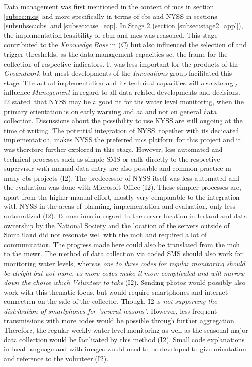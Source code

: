Data management was first mentioned in the context of \acrlong{mcs} in section \ref*{subsec:mcs} and more specifically in terms of \acrlong{cbs} and NYSS in sections \ref*{subsubsec:cbs} and \ref*{subsec:case_eap}. In Stage 2 (section \ref*{subsec:stage2_appl}), the implementation feasibility of \acrshort{cbm} and \acrshort{mcs} was reasoned.\newline
This stage contributed to the \textit{Knowledge Base} in (C) but also influenced the selection of  and trigger thresholds, as the data management capacities set the frame for the collection of respective indicators. It was less important for the products of the \textit{Groundwork} but most developments of the \textit{Innovations} group facilitated this stage. The actual implementation and its technical capacities will also strongly influence \textit{Management} in regard to all data related developments and decisions.\newline
I2 stated, that NYSS may be a good fit for the water level monitoring, when the primary orientation is on early warning and \acrlong{aa} and not on general data collection. Discussions about the possibility to use NYSS are still ongoing at the time of writing. The potential integration of NYSS, together with its dedicated implementation, makes NYSS the preferred \acrshort{mcs} platform for this project and it was therefore further explored in this stage. However, less automated and technical processes such as simple SMS or calls directly to the respective supervisor with manual data entry are also possible and common practice in many \acrshort{cbs} projects (I2). The predecessor of NYSS itself was less automated and the evaluation was done with Microsoft Office (I2). These simpler processes are, apart from the higher manual effort, mostly very comparable to the integration with NYSS in the areas of planning, implementation and evaluation, only less automatized (I2).\newline
I2 mentions in regard to the server location in Ireland and data ownership by the National Society and the location of the servers outside of Somaliland did not resonate well with the \acrshort{moh} and required a lot of communication. The progress made here could also be translated from the \acrshort{moh} to the \acrshort{mowr}.\newline
The method of data collection via coded SMS should also work for monitoring water levels, whereas \textit{one to three codes for regular monitoring should be alright but not more, as more codes make it more complicated and will narrow down the choice which Volunteer to take} (I2). Sending photos would possibly also work with this thematic focus, but would require smartphones and internet connection on the side of the collector. Though, I2 is \textit{not supporting the distribution of smartphones for 'several reasons'}. However, less frequent transmissions with more codes would be possible through further aggregation. Therefore, the regular weekly water level monitoring as well as the seasonal major data collection would be facilitated by this method (I2). Small code explanations in local language and with images would need to be developed to give orientation and reference to the volunteer (I2). \newline
